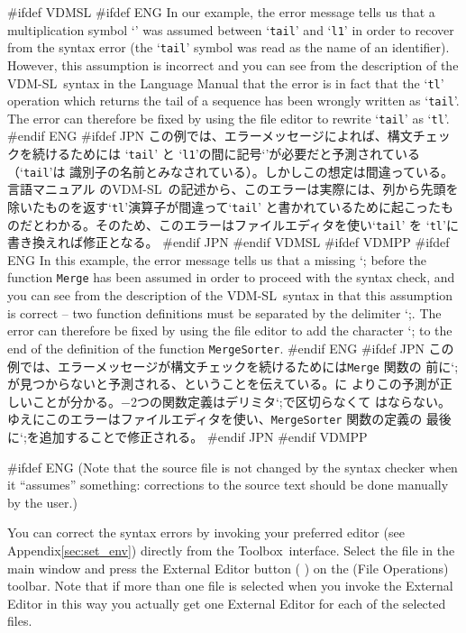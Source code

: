 \documentclass[\pformat,12pt]{article}
\newcommand{\vdmslpp}{VDM-SL}
\newcommand{\Toolbox}{Toolbox}
\newcommand{\vdmslpp}{VDM++}
\newcommand{\Toolbox}{Toolbox}
\newcommand{\Lit}[1]{`#1\Quote}
\newcommand{\aaa}{\tt }
\newcommand{\guicmd}[1]{{\sf #1}}
\newcommand{\guicmd}[1]{{\gt #1}}
\begin{document}
#ifdef VDMSL
#ifdef ENG
In our example, the error message tells us that a multiplication symbol
`{\tt*}' was assumed between `{\tt tail}' and `{\tt l1}' in order to
recover from the syntax error (the `{\tt tail}' symbol was read as the
name of an identifier). However, this assumption is incorrect and  you
can see from the  description of the \vdmslpp\ syntax in the Language
Manual\cite{LangMan-CSK} that the error is in fact that the `{\tt tl}'
operation which returns the tail of a sequence has been wrongly
written as `{\tt tail}'. The error can therefore be fixed by using the
file editor to rewrite `{\tt tail}' as `{\tt tl}'.
#endif ENG
#ifdef JPN
この例では、エラーメッセージによれば、構文チェックを続けるためには
`{\tt tail}' と `{\tt l1}'の間に記号`{\tt*}'が必要だと予測されている（`{\tt tail}'は
識別子の名前とみなされている）。しかしこの想定は間違っている。言語マニュアル\cite{LangMan-CSK} 
の\vdmslpp\ の記述から、このエラーは実際には、列から先頭を除いたものを返す`{\tt tl}'演算子が間違って`{\tt tail}'
と書かれているために起こったものだとわかる。そのため、このエラーはファイルエディタを使い`{\tt tail}' を `{\tt tl}'に
書き換えれば修正となる。
#endif JPN
#endif VDMSL
#ifdef VDMPP
#ifdef ENG
In this example, the error message tells us that a missing \Lit{;}
before the function {\aaa Merge} has been assumed in order to proceed
with the syntax check, and you can see from the  description of the
\vdmslpp\ syntax in \cite{LangManPP-CSK} that this assumption is correct
-- two function definitions must be separated by the delimiter
\Lit{;}. The error can therefore be fixed by using the file editor to
add the character \Lit{;} to the end of the definition of the function
{\aaa MergeSorter}.
#endif ENG
#ifdef JPN
この例では、エラーメッセージが構文チェックを続けるためには{\aaa Merge} 関数の
前に\Lit{;}が見つからないと予測される、ということを伝えている。\cite{LangManPP-CSK}に
よりこの予測が正しいことが分かる。−2つの関数定義はデリミタ\Lit{;}で区切らなくて
はならない。ゆえにこのエラーはファイルエディタを使い、{\aaa MergeSorter} 関数の定義の
最後に\Lit{;}を追加することで修正される。
#endif JPN
#endif VDMPP

#ifdef ENG
(Note that the source file is not  changed by the syntax checker when
it ``assumes'' something: corrections to the source text should be
done manually by the user.)

You can correct the syntax errors by invoking your preferred editor
(see Appendix\ref{sec:set_env}) directly from the \Toolbox\
interface. Select the file  in the main window and 
press the \guicmd{External Editor}\index{External Editor} button (%
\raisebox{-0.8mm}{\texttt{[image: externaleditor.png]}}) 
on the (\guicmd{File Operations}) toolbar. Note that if more than
one file is selected when you invoke the \guicmd{External Editor} in
this way you actually get one \guicmd{External Editor} for each of the
selected files.
\end{document}
